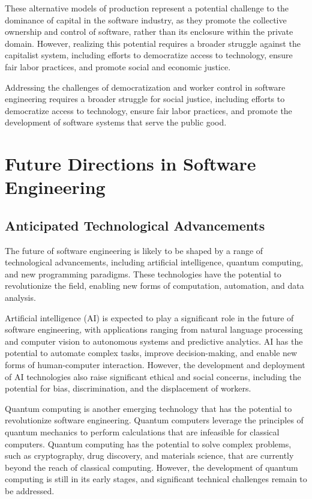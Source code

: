 \begin{refsection}
\begin{multicols}{2}
{These alternative models of production represent a potential challenge to the dominance of capital in the software industry, as they promote the collective ownership and control of software, rather than its enclosure within the private domain. However, realizing this potential requires a broader struggle against the capitalist system, including efforts to democratize access to technology, ensure fair labor practices, and promote social and economic justice.

Addressing the challenges of democratization and worker control in software engineering requires a broader struggle for social justice, including efforts to democratize access to technology, ensure fair labor practices, and promote the development of software systems that serve the public good.
}
\newpage
\end{multicols}
\section{Future Directions in Software Engineering}
\begin{multicols}{2}
{\small
\subsection{Anticipated Technological Advancements}

The future of software engineering is likely to be shaped by a range of technological advancements, including artificial intelligence, quantum computing, and new programming paradigms. These technologies have the potential to revolutionize the field, enabling new forms of computation, automation, and data analysis.

Artificial intelligence (AI) is expected to play a significant role in the future of software engineering, with applications ranging from natural language processing and computer vision to autonomous systems and predictive analytics. AI has the potential to automate complex tasks, improve decision-making, and enable new forms of human-computer interaction. However, the development and deployment of AI technologies also raise significant ethical and social concerns, including the potential for bias, discrimination, and the displacement of workers.

Quantum computing is another emerging technology that has the potential to revolutionize software engineering. Quantum computers leverage the principles of quantum mechanics to perform calculations that are infeasible for classical computers. Quantum computing has the potential to solve complex problems, such as cryptography, drug discovery, and materials science, that are currently beyond the reach of classical computing. However, the development of quantum computing is still in its early stages, and significant technical challenges remain to be addressed.

}
\end{multicols}
\end{refsection}
